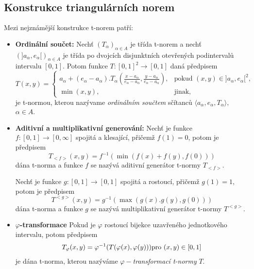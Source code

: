 \subsection{Konstrukce triangulárních norem}

Mezi nejznámější konstrukce t-norem patří:
\begin{itemize}
    \item \textbf{Ordinální součet:}
    \cite{KMP}
        Nech\v t $(T_\alpha)_{\alpha \in A}$ je třída t-norem a
        nech\v t $(]a_\alpha,e_\alpha[)_{\alpha \in A}$ je třída po dvojcích
        disjunktních otevřených podinterval\r u intervalu $[0,1].$ Potom funkce
        \hbox{$T:[0,1]^2\rightarrow [0,1]$} daná předpisem
        $$T(x,y)=\begin{cases} a_\alpha + (e_\alpha - a_\alpha ).T_\alpha (\frac
        {x-a_\alpha}{e_\alpha - a_\alpha}, \frac {y-a_\alpha}{e_\alpha - a_\alpha}),
        &\mbox {pokud $(x,y) \in ]a_\alpha ,e_\alpha [^2$,}
        \\\min(x,y), &\mbox {jinak,} \end{cases}$$
        je t-normou, kterou nazývame {\em ordinálním součtem} sčítanc\r u $\langle a_\alpha ,e_\alpha
        ,T_\alpha \rangle,$ \mbox{$ \alpha \in A.$}

    \item \textbf{Aditivní a multiplikativní generování:}
        \cite{KMP}
        Nech\v t je funkce $f:[0,1] \to [0,\infty]$ spojitá a klesající, přičemž
        $f(1)=0$, potom je předpisem
        $$ T_{<f>}(x,y)=f^{-1}(\min(f(x)+f(y),f(0)))$$
        dána t-norma a funkce $f$ se nazývá aditivní generátor t-normy
        $T_{<f>}.$
        
        Nech\v t je funkce $g:[0,1] \to [0,1]$ spojitá a rostoucí, přičemž
        $g(1)=1$, potom je předpisem
        $$ T^{<g>}(x,y)=g^{-1}(\max(g(x).g(y),g(0)))$$
        dána t-norma a funkce $g$ se nazývá multiplikativní generátor t-normy
        $T^{<g>}.$
    \item \textbf{$\varphi$-transformace}
        \cite{KMP}
        Pokud je $\varphi$ rostoucí bijekce uzavřeného jednotkového intervalu, potom
        předpisem
        $$T_\varphi (x,y)=\varphi ^{-1}(T(\varphi(x),\varphi(y)))\space \text {pro $(x,y)
        \in [0,1]$}$$
        je dána t-norma, kterou nazýváme $\varphi-${\em transformací t-normy}
        $T.$

\end{itemize}

